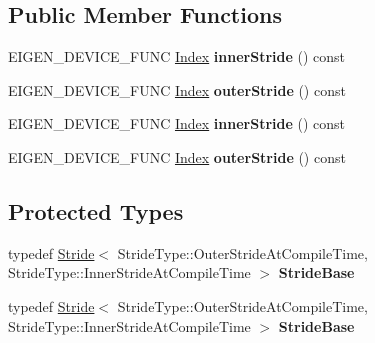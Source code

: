\subsection*{Public Member Functions}
\begin{DoxyCompactItemize}
\item 
\mbox{\label{class_eigen_1_1_ref_base_a6b596948fd93da0ef5e860499bd378b6}} 
E\+I\+G\+E\+N\+\_\+\+D\+E\+V\+I\+C\+E\+\_\+\+F\+U\+NC \hyperlink{namespace_eigen_a62e77e0933482dafde8fe197d9a2cfde}{Index} {\bfseries inner\+Stride} () const
\item 
\mbox{\label{class_eigen_1_1_ref_base_ab16f2280abb4f0818e1f65e012b65585}} 
E\+I\+G\+E\+N\+\_\+\+D\+E\+V\+I\+C\+E\+\_\+\+F\+U\+NC \hyperlink{namespace_eigen_a62e77e0933482dafde8fe197d9a2cfde}{Index} {\bfseries outer\+Stride} () const
\item 
\mbox{\label{class_eigen_1_1_ref_base_a6b596948fd93da0ef5e860499bd378b6}} 
E\+I\+G\+E\+N\+\_\+\+D\+E\+V\+I\+C\+E\+\_\+\+F\+U\+NC \hyperlink{namespace_eigen_a62e77e0933482dafde8fe197d9a2cfde}{Index} {\bfseries inner\+Stride} () const
\item 
\mbox{\label{class_eigen_1_1_ref_base_ab16f2280abb4f0818e1f65e012b65585}} 
E\+I\+G\+E\+N\+\_\+\+D\+E\+V\+I\+C\+E\+\_\+\+F\+U\+NC \hyperlink{namespace_eigen_a62e77e0933482dafde8fe197d9a2cfde}{Index} {\bfseries outer\+Stride} () const
\end{DoxyCompactItemize}
\subsection*{Protected Types}
\begin{DoxyCompactItemize}
\item 
\mbox{\label{class_eigen_1_1_ref_base_aa04c323ef5f01e4900cbd375cb850662}} 
typedef \hyperlink{group___core___module_class_eigen_1_1_stride}{Stride}$<$ Stride\+Type\+::\+Outer\+Stride\+At\+Compile\+Time, Stride\+Type\+::\+Inner\+Stride\+At\+Compile\+Time $>$ {\bfseries Stride\+Base}
\item 
\mbox{\label{class_eigen_1_1_ref_base_aa04c323ef5f01e4900cbd375cb850662}} 
typedef \hyperlink{group___core___module_class_eigen_1_1_stride}{Stride}$<$ Stride\+Type\+::\+Outer\+Stride\+At\+Compile\+Time, Stride\+Type\+::\+Inner\+Stride\+At\+Compile\+Time $>$ {\bfseries Stride\+Base}
\end{DoxyCompactItemize}
